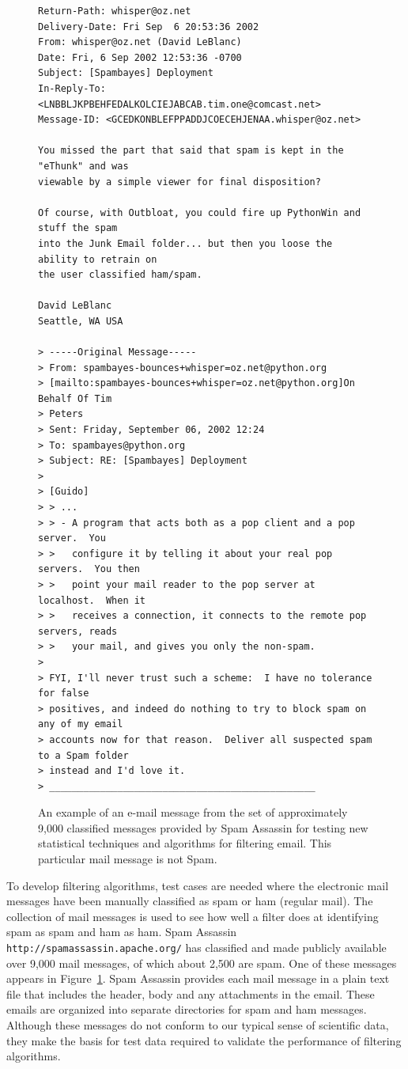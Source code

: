 \begin{figure}
{\footnotesize
\begin{verbatim}
Return-Path: whisper@oz.net
Delivery-Date: Fri Sep  6 20:53:36 2002
From: whisper@oz.net (David LeBlanc)
Date: Fri, 6 Sep 2002 12:53:36 -0700
Subject: [Spambayes] Deployment
In-Reply-To: <LNBBLJKPBEHFEDALKOLCIEJABCAB.tim.one@comcast.net>
Message-ID: <GCEDKONBLEFPPADDJCOECEHJENAA.whisper@oz.net>

You missed the part that said that spam is kept in the "eThunk" and was
viewable by a simple viewer for final disposition?

Of course, with Outbloat, you could fire up PythonWin and stuff the spam
into the Junk Email folder... but then you loose the ability to retrain on
the user classified ham/spam.

David LeBlanc
Seattle, WA USA

> -----Original Message-----
> From: spambayes-bounces+whisper=oz.net@python.org
> [mailto:spambayes-bounces+whisper=oz.net@python.org]On Behalf Of Tim
> Peters
> Sent: Friday, September 06, 2002 12:24
> To: spambayes@python.org
> Subject: RE: [Spambayes] Deployment
>
> [Guido]
> > ...
> > - A program that acts both as a pop client and a pop server.  You
> >   configure it by telling it about your real pop servers.  You then
> >   point your mail reader to the pop server at localhost.  When it
> >   receives a connection, it connects to the remote pop servers, reads
> >   your mail, and gives you only the non-spam.
>
> FYI, I'll never trust such a scheme:  I have no tolerance for false
> positives, and indeed do nothing to try to block spam on any of my email
> accounts now for that reason.  Deliver all suspected spam to a Spam folder
> instead and I'd love it.
> _______________________________________________
\end{verbatim}
}
\caption{An example of an e-mail message from the set of approximately
  9,000 classified messages provided by Spam Assassin for testing new
  statistical techniques and algorithms for filtering email. This
  particular mail message is not Spam.}
\label{fig:sampleEmail}
\end{figure}


To develop filtering algorithms, test cases are needed where the
electronic mail messages have been manually classified as spam or ham
(regular mail).  The collection of mail messages is used to see how
well a filter does at identifying spam as spam and ham as ham.
Spam Assassin\\
\texttt{http://spamassassin.apache.org/} has classified and made
publicly available over 9,000 mail messages, of which about 2,500 are
spam.  One of these messages appears in Figure~\ref{fig:sampleEmail}.
Spam Assassin provides each mail message in a plain text file that
includes the header, body and any attachments in the email. These
emails are organized into separate directories for spam and ham
messages.  Although these messages do not conform to our typical sense
of scientific data, they make the basis for test data required to
validate the performance of filtering algorithms.

